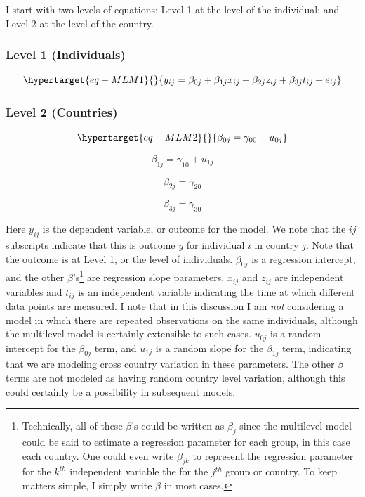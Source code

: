 \documentclass[
  letterpaper,
  DIV=11,
  numbers=noendperiod]{scrreprt}
\begin{document}
I start with two levels of equations: Level 1 at the level of the
individual; and Level 2 at the level of the country.

\hypertarget{level-1-individuals}{%
\subsubsection{Level 1 (Individuals)}\label{level-1-individuals}}

\begin{equation}\protect\hypertarget{eq-MLM1}{}{y_{ij} = \beta_{0j} + \beta_{1j} x_{ij} + \beta_{2j} z_{ij} + \beta_{3j} t_{ij} + e_{ij}}\label{eq-MLM1}\end{equation}

\hypertarget{level-2-countries}{%
\subsubsection{Level 2 (Countries)}\label{level-2-countries}}

\begin{equation}\protect\hypertarget{eq-MLM2}{}{\beta_{0j} = \gamma_{00} + u_{0j}}\label{eq-MLM2}\end{equation}

\[\beta_{1j} = \gamma_{10} + u_{1j}\]

\[\beta_{2j} = \gamma_{20}\]

\[\beta_{3j} = \gamma_{30}\]

Here \(y_{ij}\) is the dependent variable, or outcome for the model. We
note that the \(ij\) subscripts indicate that this is outcome \(y\) for
individual \(i\) in country \(j\). Note that the outcome is at Level 1,
or the level of individuals. \(\beta_{0j}\) is a regression intercept,
and the other \(\beta\)'s\footnote{Technically, all of these \(\beta\)'s
  could be written as \(\beta_j\) since the multilevel model could be
  said to estimate a regression parameter for each group, in this case
  each country. One could even write \(\beta_{jk}\) to represent the
  regression parameter for the \(k^{th}\) independent variable the for
  the \(j^{th}\) group or country. To keep matters simple, I simply
  write \(\beta\) in most cases.} are regression slope parameters.
\(x_{ij}\) and \(z_{ij}\) are independent variables and \(t_{ij}\) is an
independent variable indicating the time at which different data points
are measured. I note that in this discussion I am \emph{not} considering
a model in which there are repeated observations on the same
individuals, although the multilevel model is certainly extensible to
such cases. \(u_{0j}\) is a random intercept for the \(\beta_{0j}\)
term, and \(u_{1j}\) is a random slope for the \(\beta_{1j}\) term,
indicating that we are modeling cross country variation in these
parameters. The other \(\beta\) terms are not modeled as having random
country level variation, although this could certainly be a possibility
in subsequent models.
\end{document}
